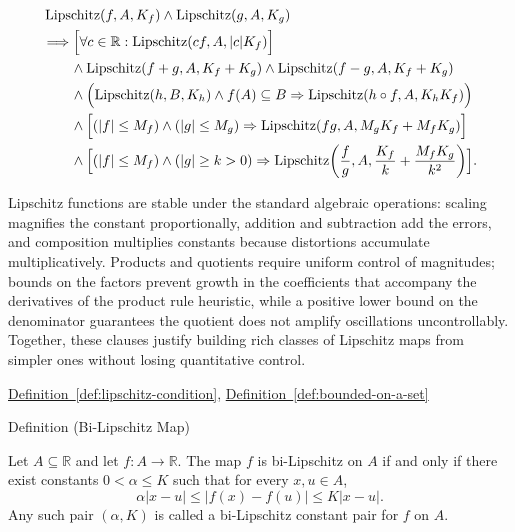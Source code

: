 \begin{remark*}
\[
\begin{aligned}
&\operatorname{Lipschitz}(f,A,K_f)\land \operatorname{Lipschitz}(g,A,K_g) \\
&\Longrightarrow \Bigl[\forall c\in\mathbb{R}:\operatorname{Lipschitz}(cf,A,|c|K_f)\Bigr]\\
&\qquad\land \operatorname{Lipschitz}(f+g,A,K_f+K_g)\land \operatorname{Lipschitz}(f-g,A,K_f+K_g)\\
&\qquad\land \Bigl(\operatorname{Lipschitz}(h,B,K_h)\land f(A)\subseteq B\Rightarrow \operatorname{Lipschitz}(h\circ f,A,K_hK_f)\Bigr)\\
&\qquad\land \Bigl[(|f|\le M_f)\land(|g|\le M_g)\Rightarrow \operatorname{Lipschitz}(fg,A,M_gK_f+M_fK_g)\Bigr]\\
&\qquad\land \Bigl[(|f|\le M_f)\land(|g|\ge k>0)\Rightarrow \operatorname{Lipschitz}\!\left(\frac{f}{g},A,\frac{K_f}{k}+\frac{M_fK_g}{k^2}\right)\Bigr].
\end{aligned}
\]
\end{remark*}

\begin{remark*}[Interpretation]
Lipschitz functions are stable under the standard algebraic operations: scaling magnifies the constant proportionally, addition and subtraction add the errors, and composition multiplies constants because distortions accumulate multiplicatively. Products and quotients require uniform control of magnitudes; bounds on the factors prevent growth in the coefficients that accompany the derivatives of the product rule heuristic, while a positive lower bound on the denominator guarantees the quotient does not amplify oscillations uncontrollably. Together, these clauses justify building rich classes of Lipschitz maps from simpler ones without losing quantitative control.
\end{remark*}

\begin{dependencies}
\hyperref[def:lipschitz-condition]{Definition~\ref{def:lipschitz-condition}}, \hyperref[def:bounded-on-a-set]{Definition~\ref{def:bounded-on-a-set}}
\end{dependencies}


\begin{definitionbox}{Definition (Bi-Lipschitz Map)}
\begin{definition}
\label{def:bi-lipschitz}
Let $A\subseteq \mathbb{R}$ and let $f:A\to\mathbb{R}$. The map $f$ is bi-Lipschitz on $A$ if and only if there exist constants $0<\alpha\le K$ such that for every $x,u\in A$,
\[
\alpha|x-u|\le |f(x)-f(u)|\le K|x-u|.
\]
Any such pair $(\alpha,K)$ is called a bi-Lipschitz constant pair for $f$ on $A$.
\end{definition}
\end{definitionbox}

